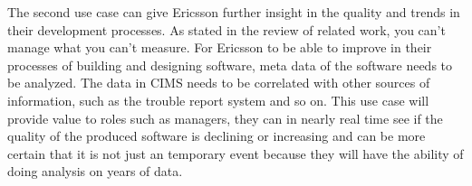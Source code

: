 The second use case can give Ericsson further insight in the quality and trends in their development processes. As stated in the review of related work, you can't manage what you can't measure. For Ericsson to be able to improve in their processes of building and designing software, meta data of the software needs to be analyzed. The data in CIMS needs to be correlated with other sources of information, such as the trouble report system and so on. This use case will provide value to roles such as managers, they can in nearly real time see if the quality of the produced software is declining or increasing and can be more certain that it is not just an temporary event because they will have the ability of doing analysis on years of data. 






